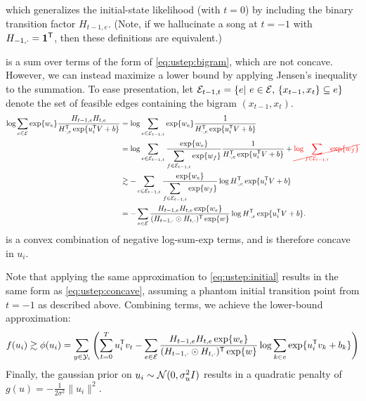 \documentclass{article}
\newcommand{\ccancel}[2][black]{\color{#1}\cancel{#2}\normalcolor}
\def\E{\ensuremath{\mathcal{E}}}
\begin{document}
which generalizes the initial-state likelihood (with $t=0$) by including the binary transition factor $H_{t-1,e}$.  
(Note, if we hallucinate a song at $t=-1$ with $H_{-1,\cdot} = \mathbf{1}^\mathsf{T}$, then these definitions are equivalent.)

 is a sum over terms of the form of \cref{eq:ustep:bigram}, which are not concave.  However, we can instead maximize a lower bound by applying Jensen's inequality to
the summation.  To ease presentation, let ${\E_{t-1,t} = \{e \given e \in \E,\, \{x_{t-1}, x_{t}\} \subseteq e\}}$ denote the set of feasible edges containing the bigram $(x_{t-1}, x_t)$.
\begin{align}
\log\sum_{e\in \E} \exp\{w_e\} \frac{H_{t-1,e} H_{t, e} }{H_{\cdot,e}\trans \exp\{u_i\trans V + b \} }
&= \log\sum_{e \in \E_{t-1,t}} \exp\{w_e\} \frac{1}{H_{\cdot, e}\trans \exp\{u_i\trans V + b\} }\notag\\
&= \log\sum_{e \in \E_{t-1,t}} \frac{\exp\{w_e\}}{\displaystyle\sum_{f\in\E_{t-1,t}} \exp\{w_f\}} \frac{1}{H_{\cdot, e}\trans \exp\{u_i\trans V + b\} } + \ccancel[red]{\log \sum_{f \in \E_{t-1,t}} \exp\{w_f\}}\notag\\
&\gtrsim -\sum_{e \in \E_{t-1,t}} \frac{\exp\{w_e\}}{\displaystyle\sum_{f\in\E_{t-1,t}} \exp\{w_f\}} \log H_{\cdot, e}\trans \exp\{u_i\trans V + b\}  \notag\\
&= -\sum_{e\in\E} \frac{H_{t-1,e} H_{t,e} \exp\{w_e\}}{ (H_{t-1,\cdot} \odot H_{t,\cdot})\trans \exp\{w\}} \log H_{\cdot, e}\trans \exp\{u_i\trans V + b\}  \label{eq:ustep:concave}.
\end{align}
 is a convex combination of negative log-sum-exp terms, and is therefore concave in $u_i$.  

Note that applying the same approximation to \cref{eq:ustep:initial} results in the same form as \cref{eq:ustep:concave}, assuming a phantom initial transition point from $t=-1$ 
as described above.  Combining terms, we achieve the lower-bound approximation:
\begin{equation}
f(u_i) \gtrsim \phi(u_i) = \sum_{y \in \Y_i} \left(\sum_{t=0}^T u_i\trans v_t - \sum_{e \in \E} \frac{H_{t-1,e} H_{t,e} \exp\{w_e\}}{ (H_{t-1,\cdot}\odot H_{t,\cdot})\trans \exp\{w\}} \log
\sum_{k\in e} \exp\{u_i\trans v_k + b_k\} \right)\label{eq:ustep:concave_obj}
\end{equation}
Finally, the gaussian prior on $u_i \sim \mathcal{N}(0, \sigma_u^2 I)$ results in a quadratic penalty of $g(u) = -\frac{1}{2\sigma^2}\|u_i\|^2$.
\end{document}
